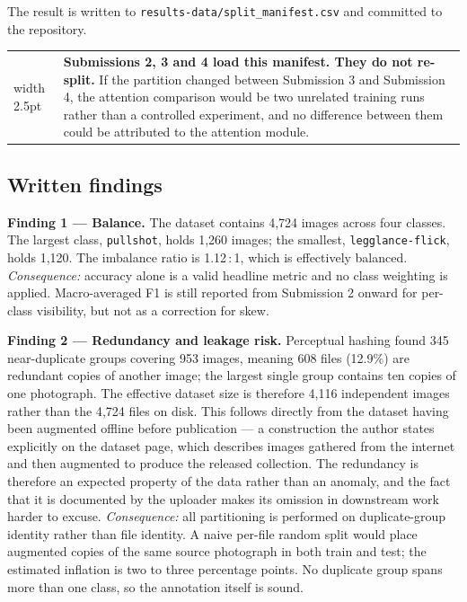 \documentclass[11pt,a4paper]{article}
\makeatletter
\newenvironment{keybox}
  {\par\medskip\noindent\begin{tabular}{@{}p{0.3em}@{\hspace{0.8em}}p{\dimexpr\linewidth-2.2em}@{}}
   {\color{accent}\vrule width 2.5pt} &}
  {\end{tabular}\par\medskip}
\makeatother
\begin{document}
The result is written to \texttt{results-data/split\_manifest.csv} and committed to the
repository.

\begin{keybox}
\textbf{Submissions 2, 3 and 4 load this manifest. They do not re-split.} If the
partition changed between Submission 3 and Submission 4, the attention comparison would
be two unrelated training runs rather than a controlled experiment, and no difference
between them could be attributed to the attention module.
\end{keybox}

\subsection{Written findings}

\textbf{Finding 1 --- Balance.} The dataset contains 4{,}724 images across four classes.
The largest class, \texttt{pullshot}, holds 1{,}260 images; the smallest,
\texttt{legglance-flick}, holds 1{,}120. The imbalance ratio is 1.12\,:\,1, which is
effectively balanced. \emph{Consequence:} accuracy alone is a valid headline metric and
no class weighting is applied. Macro-averaged F1 is still reported from Submission 2
onward for per-class visibility, but not as a correction for skew.

\textbf{Finding 2 --- Redundancy and leakage risk.} Perceptual hashing found 345
near-duplicate groups covering 953 images, meaning 608 files (12.9\%) are redundant
copies of another image; the largest single group contains ten copies of one photograph.
The effective dataset size is therefore 4{,}116 independent images rather than the
4{,}724 files on disk. This follows directly from the dataset having been augmented
offline before publication --- a construction the author states explicitly on the
dataset page, which describes images gathered from the internet and then augmented
to produce the released collection. The redundancy is therefore an expected
property of the data rather than an anomaly, and the fact that it is documented by
the uploader makes its omission in downstream work harder to excuse. \emph{Consequence:} all partitioning is performed on
duplicate-group identity rather than file identity. A naive per-file random split would
place augmented copies of the same source photograph in both train and test; the
estimated inflation is two to three percentage points. No duplicate group spans more
than one class, so the annotation itself is sound.
\end{document}
